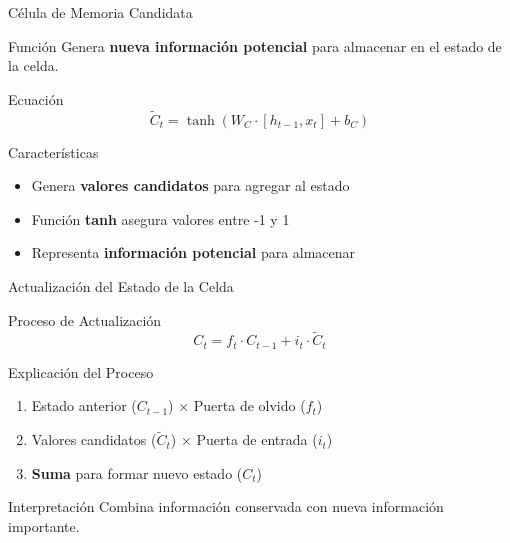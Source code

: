 \documentclass[
  ignorenonframetext,
]{beamer}
\providecommand{\tightlist}{%
  \setlength{\itemsep}{0pt}\setlength{\parskip}{0pt}}
\begin{document}
\begin{frame}{Célula de Memoria Candidata}
\label{cuxe9lula-de-memoria-candidata}
\begin{block}{Función}
\label{funciuxf3n}
Genera \textbf{nueva información potencial} para almacenar en el estado
de la celda.
\end{block}

\begin{block}{Ecuación}
\label{ecuaciuxf3n}
\[\tilde{C}_t = \tanh(W_C \cdot [h_{t-1}, x_t] + b_C)\]
\end{block}

\begin{block}{Características}
\label{caracteruxedsticas}
\begin{itemize}
\tightlist
\item
  Genera \textbf{valores candidatos} para agregar al estado
\item
  Función \textbf{tanh} asegura valores entre -1 y 1
\item
  Representa \textbf{información potencial} para almacenar
\end{itemize}
\end{block}
\end{frame}

\begin{frame}{Actualización del Estado de la Celda}
\label{actualizaciuxf3n-del-estado-de-la-celda}
\begin{block}{Proceso de Actualización}
\label{proceso-de-actualizaciuxf3n}
\[C_t = f_t \cdot C_{t-1} + i_t \cdot \tilde{C}_t\]
\end{block}

\begin{block}{Explicación del Proceso}
\label{explicaciuxf3n-del-proceso}
\begin{enumerate}
\tightlist
\item
  Estado anterior (\(C_{t-1}\)) × Puerta de olvido (\(f_t\))
\item
  Valores candidatos (\(\tilde{C}_t\)) × Puerta de entrada (\(i_t\))
\item
  \textbf{Suma} para formar nuevo estado (\(C_t\))
\end{enumerate}
\end{block}

\begin{block}{Interpretación}
\label{interpretaciuxf3n-1}
Combina información conservada con nueva información importante.
\end{block}
\end{frame}
\end{document}
